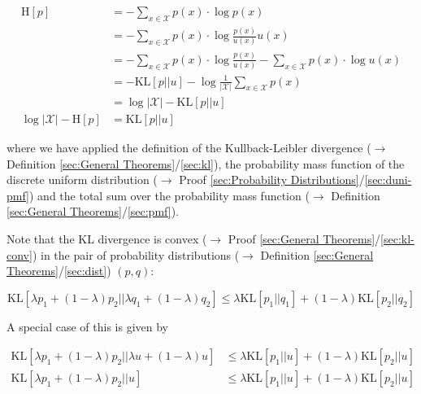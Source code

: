 \documentclass[a4paper,12pt,twoside]{book}
\begin{document}
\begin{equation} \label{eq:ent-conc-ent-kl}
\begin{split}
\mathrm{H}[p] &= - \sum_{x \in \mathcal{X}} p(x) \cdot \log p(x) \\
&= - \sum_{x \in \mathcal{X}} p(x) \cdot \log \frac{p(x)}{u(x)} u(x) \\
&= - \sum_{x \in \mathcal{X}} p(x) \cdot \log \frac{p(x)}{u(x)} - \sum_{x \in \mathcal{X}} p(x) \cdot \log u(x) \\
&= - \mathrm{KL}[p||u] - \log \frac{1}{|\mathcal{X}|} \sum_{x \in \mathcal{X}} p(x) \\
&= \log |\mathcal{X}| - \mathrm{KL}[p||u] \\
\log |\mathcal{X}| - \mathrm{H}[p] &= \mathrm{KL}[p||u]
\end{split}
\end{equation}

where we have applied the definition of the Kullback-Leibler divergence ($\rightarrow$ Definition \ref{sec:General Theorems}/\ref{sec:kl}), the probability mass function of the discrete uniform distribution ($\rightarrow$ Proof \ref{sec:Probability Distributions}/\ref{sec:duni-pmf}) and the total sum over the probability mass function ($\rightarrow$ Definition \ref{sec:General Theorems}/\ref{sec:pmf}).

Note that the KL divergence is convex ($\rightarrow$ Proof \ref{sec:General Theorems}/\ref{sec:kl-conv}) in the pair of probability distributions ($\rightarrow$ Definition \ref{sec:General Theorems}/\ref{sec:dist}) $(p,q)$:

\begin{equation} \label{eq:ent-conc-kl-conv}
\mathrm{KL}[\lambda p_1 + (1-\lambda) p_2||\lambda q_1 + (1-\lambda) q_2] \leq \lambda \mathrm{KL}[p_1||q_1] + (1-\lambda) \mathrm{KL}[p_2||q_2]
\end{equation}

A special case of this is given by

\begin{equation} \label{eq:ent-conc-kl-conv-u}
\begin{split}
\mathrm{KL}[\lambda p_1 + (1-\lambda) p_2||\lambda u + (1-\lambda) u] &\leq \lambda \mathrm{KL}[p_1||u] + (1-\lambda) \mathrm{KL}[p_2||u] \\
\mathrm{KL}[\lambda p_1 + (1-\lambda) p_2||u] &\leq \lambda \mathrm{KL}[p_1||u] + (1-\lambda) \mathrm{KL}[p_2||u]
\end{split}
\end{equation}
\end{document}
